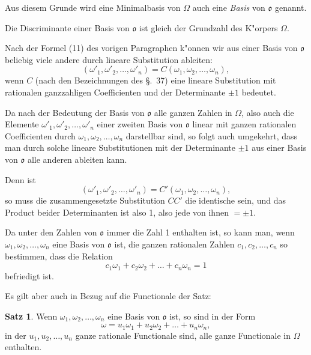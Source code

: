 \documentclass[12pt,a4paper]{article}
\theoremstyle{definition}
\newtheorem*{satz}{Satz}
\begin{document}
Aus diesem Grunde wird eine Minimalbasis von $\Omega$ auch eine \emph{Basis} von $\mathfrak{o}$ genannt.

Die Discriminante einer Basis von $\mathfrak{o}$ ist gleich der Grundzahl des K"orpers $\Omega$.

Nach der Formel (11) des vorigen Paragraphen k"onnen wir aus einer Basis von $\mathfrak{o}$ beliebig viele andere durch lineare Substitution ableiten:
\begin{equation}
(\omega'_1, \omega'_2, \dots, \omega'_n) = C(\omega_1, \omega_2, \dots, \omega_n),
\end{equation}
wenn $C$ (nach den Bezeichnungen des \S.~37) eine lineare Substitution mit rationalen ganzzahligen Coefficienten und der Determinante $\pm 1$ bedeutet.

Da nach der Bedeutung der Basis von $\mathfrak{o}$ alle ganzen Zahlen in $\Omega$, also auch die Elemente $\omega'_1, \omega'_2, \dots, \omega'_n$ einer zweiten Basis von $\mathfrak{o}$ linear mit ganzen rationalen Coefficienten durch $\omega_1, \omega_2, \dots, \omega_n$ darstellbar sind, so folgt auch umgekehrt, dass man durch solche lineare Substitutionen mit der Determinante $\pm 1$ aus einer Basis von $\mathfrak{o}$ alle anderen ableiten kann.

Denn ist
\begin{equation}
(\omega'_1, \omega'_2, \dots, \omega'_n) = C'(\omega_1, \omega_2, \dots, \omega_n),
\end{equation}
so muss die zusammengesetzte Substitution $CC'$ die identische sein, und das Product beider Determinanten ist also 1, also jede von ihnen $= \pm 1$.

Da unter den Zahlen von $\mathfrak{o}$ immer die Zahl 1 enthalten ist, so kann man, wenn $\omega_1, \omega_2, \dots, \omega_n$ eine Basis von $\mathfrak{o}$ ist, die ganzen rationalen Zahlen $c_1, c_2, \dots, c_n$ so bestimmen, dass die Relation
\begin{equation}
c_1\omega_1 + c_2\omega_2 + \dots + c_n\omega_n = 1
\end{equation}
befriedigt ist.

Es gilt aber auch in Bezug auf die Functionale der Satz:

\begin{satz}
Wenn $\omega_1, \omega_2, \dots, \omega_n$ eine Basis von $\mathfrak{o}$ ist, so sind in der Form
\begin{equation}
\omega = u_1\omega_1 + u_2\omega_2 + \dots + u_n\omega_n,
\end{equation}
in der $u_1, u_2, \dots, u_n$ ganze rationale Functionale sind, alle ganze Functionale in $\Omega$ enthalten.
\end{satz}
\end{document}
